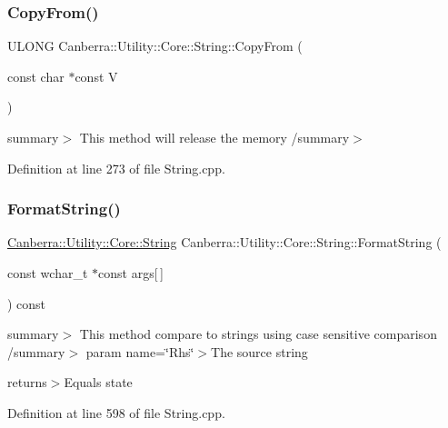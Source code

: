 \subsubsection{\texorpdfstring{Copy\+From()}{CopyFrom()}\hspace{0.1cm}{\footnotesize\ttfamily [2/2]}}
{\footnotesize\ttfamily U\+L\+O\+NG Canberra\+::\+Utility\+::\+Core\+::\+String\+::\+Copy\+From (\begin{DoxyParamCaption}\item[{const char $\ast$const}]{V }\end{DoxyParamCaption})}

summary$>$ This method will release the memory /summary$>$ 

Definition at line 273 of file String.\+cpp.

\mbox{\label{class_canberra_1_1_utility_1_1_core_1_1_string_a8b267a12b15e211ad18df3c13bcdd7c9_a8b267a12b15e211ad18df3c13bcdd7c9}} 
\subsubsection{\texorpdfstring{Format\+String()}{FormatString()}}
{\footnotesize\ttfamily \hyperlink{class_canberra_1_1_utility_1_1_core_1_1_string}{Canberra\+::\+Utility\+::\+Core\+::\+String} Canberra\+::\+Utility\+::\+Core\+::\+String\+::\+Format\+String (\begin{DoxyParamCaption}\item[{const wchar\+\_\+t $\ast$const}]{args\mbox{[}$\,$\mbox{]} }\end{DoxyParamCaption}) const}

summary$>$ This method compare to strings using case sensitive comparison /summary$>$ param name=\char`\"{}\+Rhs\char`\"{}$>$The source string

returns$>$Equals state

Definition at line 598 of file String.\+cpp.

\mbox{\label{class_canberra_1_1_utility_1_1_core_1_1_string_af139376ec3c87735c440d7b3ba45bc13_af139376ec3c87735c440d7b3ba45bc13}} 
